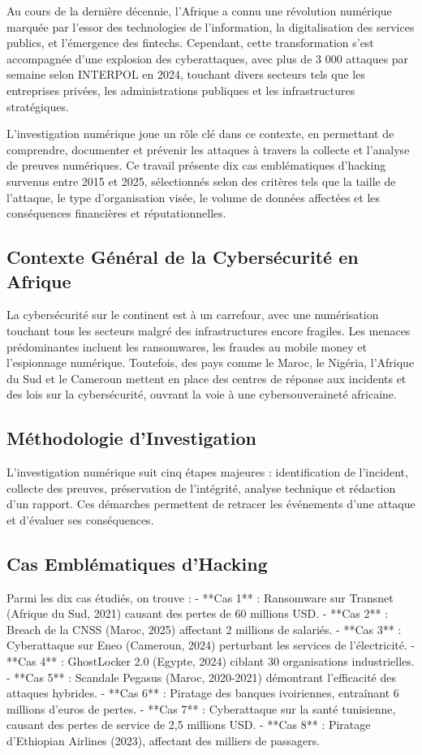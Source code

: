 \documentclass[12pt,a4paper]{article}
\begin{document}
Au cours de la dernière décennie, l'Afrique a connu une révolution numérique marquée par l'essor des technologies de l'information, la digitalisation des services publics, et l'émergence des fintechs. Cependant, cette transformation s'est accompagnée d'une explosion des cyberattaques, avec plus de 3 000 attaques par semaine selon INTERPOL en 2024, touchant divers secteurs tels que les entreprises privées, les administrations publiques et les infrastructures stratégiques.

L’investigation numérique joue un rôle clé dans ce contexte, en permettant de comprendre, documenter et prévenir les attaques à travers la collecte et l'analyse de preuves numériques. Ce travail présente dix cas emblématiques d'hacking survenus entre 2015 et 2025, sélectionnés selon des critères tels que la taille de l'attaque, le type d'organisation visée, le volume de données affectées et les conséquences financières et réputationnelles.

\subsection{Contexte Général de la Cybersécurité en Afrique}
La cybersécurité sur le continent est à un carrefour, avec une numérisation touchant tous les secteurs malgré des infrastructures encore fragiles. Les menaces prédominantes incluent les ransomwares, les fraudes au mobile money et l'espionnage numérique. Toutefois, des pays comme le Maroc, le Nigéria, l’Afrique du Sud et le Cameroun mettent en place des centres de réponse aux incidents et des lois sur la cybersécurité, ouvrant la voie à une cybersouveraineté africaine.

\subsection{Méthodologie d'Investigation}
L’investigation numérique suit cinq étapes majeures : identification de l’incident, collecte des preuves, préservation de l’intégrité, analyse technique et rédaction d’un rapport. Ces démarches permettent de retracer les événements d'une attaque et d'évaluer ses conséquences.

\subsection{Cas Emblématiques d'Hacking}
Parmi les dix cas étudiés, on trouve :
- **Cas 1** : Ransomware sur Transnet (Afrique du Sud, 2021) causant des pertes de 60 millions USD.
- **Cas 2** : Breach de la CNSS (Maroc, 2025) affectant 2 millions de salariés.
- **Cas 3** : Cyberattaque sur Eneo (Cameroun, 2024) perturbant les services de l’électricité.
- **Cas 4** : GhostLocker 2.0 (Egypte, 2024) ciblant 30 organisations industrielles.
- **Cas 5** : Scandale Pegasus (Maroc, 2020-2021) démontrant l'efficacité des attaques hybrides.
- **Cas 6** : Piratage des banques ivoiriennes, entraînant 6 millions d'euros de pertes.
- **Cas 7** : Cyberattaque sur la santé tunisienne, causant des pertes de service de 2,5 millions USD.
- **Cas 8** : Piratage d'Ethiopian Airlines (2023), affectant des milliers de passagers.
\end{document}
